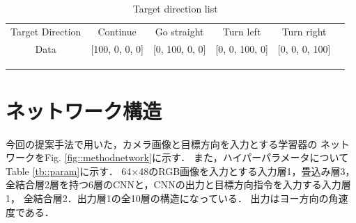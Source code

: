  \begin{table}[h]
      \centering
      \caption{Target direction list}
      \begin{tabular}{ccccll}
      \cline{1-5}
      \multicolumn{1}{|c|}{Target Direction} & \multicolumn{1}{c|}{Continue}&\multicolumn{1}{c|}{Go straight}          & \multicolumn{1}{c|}{Turn left}          & \multicolumn{1}{c|}{Turn right}          &  \\ \cline{1-5}
      \multicolumn{1}{|c|}{Data}  &\multicolumn{1}{c|}{{[}100, 0, 0, 0{]}}& \multicolumn{1}{c|}{{[}0, 100, 0, 0{]}} & \multicolumn{1}{c|}{{[}0, 0, 100, 0{]}} & \multicolumn{1}{l|}{{[}0, 0, 0, 100{]}} &  \\ \cline{1-5}
                                 &                                  &                                  &                                  &  \\
                                 &                                  &                                  &                                  &  \\
      \multicolumn{1}{l}{}       &                                  &                                  &                                  & 
      \end{tabular}
      \vspace{-3.0zh}
      \label{tb:command_4}
      \end{table}
\newpage
\section{ネットワーク構造}
\label{net}
今回の提案手法で用いた，カメラ画像と目標方向を入力とする学習器の
ネットワークをFig. \ref{fig::methodnetwork}に示す．
また，ハイパーパラメータについてTable \ref{tb::param}に示す．
64×48のRGB画像を入力とする入力層1，畳込み層3，全結合層2層を持つ6層のCNNと，CNNの出力と目標方向指令を入力する入力層1，
全結合層2．出力層1の全10層の構造になっている．
出力はヨー方向の角速度である．

